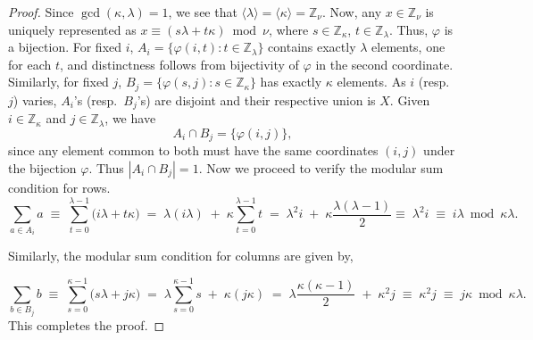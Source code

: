 \documentclass[preprint,11pt]{elsarticle}
\begin{document}
\begin{proof}
Since $\gcd(\kappa,\lambda)=1$, we see that $\langle \lambda\rangle = \langle \kappa \rangle = \mathbb{Z}_\nu$.
Now, any $x\in\mathbb{Z}_\nu$ is uniquely represented  as $x\equiv (s\lambda+t\kappa)\bmod{\nu}$, where $s\in\mathbb{Z}_\kappa$, $t\in\mathbb{Z}_\lambda$. Thus,  $\varphi$ is a bijection.
For fixed $i$, $A_i=\{\varphi(i,t):t\in\mathbb{Z}_\lambda\}$ contains exactly $\lambda$ elements,
one for each $t$, and distinctness follows from bijectivity of $\varphi$ in the second coordinate.
Similarly, for fixed $j$,  $B_j=\{\varphi(s,j):s\in\mathbb{Z}_\kappa\}$ has exactly $\kappa$ elements.
As $i$ (resp.\ $j$) varies,  $A_i$'s (resp.\ $B_j$'s) are disjoint and their respective union is $X$.
Given $i\in\mathbb{Z}_\kappa$ and $j\in\mathbb{Z}_\lambda$, we have
\[
A_i\cap B_j=\{\varphi(i,j)\},
\]
since any element common to both must have the same coordinates $(i,j)$ under the bijection $\varphi$.
Thus $|A_i\cap B_j|=1$.  Now we proceed to verify the modular sum condition for rows.
\[
\sum_{a\in A_i}a \;\equiv\; \sum_{t=0}^{\lambda-1} \bigl(i\lambda+t\kappa\bigr)
\;=\;\lambda (i\lambda)\;+\;\kappa\sum_{t=0}^{\lambda-1} t
\;=\;\lambda^2 i\;+\;\kappa\frac{\lambda(\lambda-1)}{2}\equiv\; \lambda^2 i \;\equiv\; i\lambda \bmod{\kappa\lambda}.
\]

\noindent Similarly, the modular sum condition for columns are given by, 
 
\[
\sum_{b\in B_j}b \;\equiv\; \sum_{s=0}^{\kappa-1} \bigl(s\lambda+j\kappa\bigr)
\;=\;\lambda\sum_{s=0}^{\kappa-1} s\;+\;\kappa( j\kappa)
\;=\;\lambda\frac{\kappa(\kappa-1)}{2}\;+\;\kappa^2 j\;\equiv\; \kappa^2 j \;\equiv\; j\kappa \bmod{\kappa\lambda}.
\] This completes the proof.
\end{proof}
\end{document}
